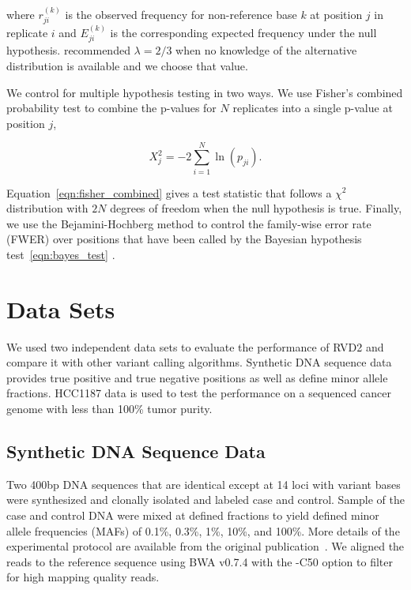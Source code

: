 \documentclass[11pt,reqno]{amsart}
\begin{document}
where $r_{ji}^{(k)}$ is the observed frequency for non-reference base $k$ at position $j$ in replicate $i$ and $E_{ji}^{(k)}$ is the corresponding expected frequency under the null hypothesis. \citet{Cressie1984} recommended $\lambda = 2/3$ when no knowledge of the alternative distribution is available and we choose that value.

We control for multiple hypothesis testing in two ways. We use Fisher's combined probability test \citep{} to combine the p-values for $N$ replicates into a single p-value at position $j$,

\begin{equation}\label{eqn:fisher_combined}
	X_j^2 = -2 \sum_{i=1}^N \ln(p_{ji}).
\end{equation}

Equation~\eqref{eqn:fisher_combined} gives a test statistic that follows a $\chi^2$ distribution with $2N$ degrees of freedom when the null hypothesis is true. Finally, we use the Bejamini-Hochberg method to control the family-wise error rate (FWER) over positions that have been called by the Bayesian hypothesis test~\eqref{eqn:bayes_test} \citep{benjamini1995controlling, efron2010large}.



\section{Data Sets}

We used two independent data sets to evaluate the performance of RVD2 and compare it with other variant calling algorithms. Synthetic DNA sequence data provides true positive and true negative positions as well as define minor allele fractions. HCC1187 data is used to test the performance on a sequenced cancer genome with less than 100\% tumor purity.

\subsection{Synthetic DNA Sequence Data}

Two 400bp DNA sequences that are identical except at 14 loci with variant bases were synthesized and clonally isolated and labeled case and control. Sample of the case and control DNA were mixed at defined fractions to yield defined minor allele frequencies (MAFs) of 0.1\%, 0.3\%, 1\%, 10\%, and 100\%. More details of the experimental protocol are available from the original publication~\citep{Flaherty:2011ja}. We aligned the reads to the reference sequence using BWA v0.7.4 with the -C50 option to filter for high mapping quality reads.
\end{document}
